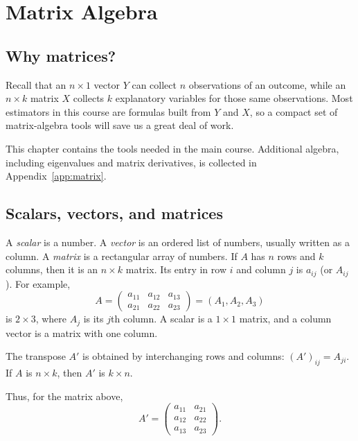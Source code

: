\chapter{Matrix Algebra}
\label{ch:matrix}

\section{Why matrices?}

Recall that an $n\times 1$ vector $Y$ can collect $n$ observations of an
outcome, while an $n\times k$ matrix $X$ collects $k$ explanatory variables
for those same observations.  Most estimators in this course are formulas
built from $Y$ and $X$, so a compact set of matrix-algebra tools will save us
a great deal of work.

This chapter contains the tools needed in the main course.  Additional
algebra, including eigenvalues and matrix derivatives, is collected in
Appendix~\ref{app:matrix}.

\section{Scalars, vectors, and matrices}

A \emph{scalar} is a number.  A \emph{vector} is an ordered list of numbers,
usually written as a column.  A \emph{matrix} is a rectangular array of
numbers.  If $A$ has $n$ rows and $k$ columns, then it is an $n\times k$
matrix.  Its entry in row $i$ and column $j$ is $a_{ij}$ (or $A_{ij}$).
For example,
\[
  A=\begin{pmatrix}
    a_{11}&a_{12}&a_{13}\\
    a_{21}&a_{22}&a_{23}
  \end{pmatrix}
  =(A_1,A_2,A_3)
\]
is $2\times3$, where $A_j$ is its $j$th column.  A scalar is a $1\times1$
matrix, and a column vector is a matrix with one column.

\begin{definition}[Transpose]
The transpose $A'$ is obtained by interchanging rows and columns:
$(A')_{ij}=A_{ji}$.  If $A$ is $n\times k$, then $A'$ is $k\times n$.
\end{definition}

Thus, for the matrix above,
\[
  A'=\begin{pmatrix}
    a_{11}&a_{21}\\
    a_{12}&a_{22}\\
    a_{13}&a_{23}
  \end{pmatrix}.
\]

